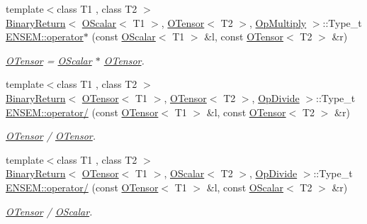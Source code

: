 \begin{DoxyCompactItemize}
{\footnotesize template$<$class T1 , class T2 $>$ }\\\mbox{\hyperlink{structENSEM_1_1BinaryReturn}{Binary\+Return}}$<$ \mbox{\hyperlink{classENSEM_1_1OScalar}{O\+Scalar}}$<$ T1 $>$, \mbox{\hyperlink{classENSEM_1_1OTensor}{O\+Tensor}}$<$ T2 $>$, \mbox{\hyperlink{structENSEM_1_1OpMultiply}{Op\+Multiply}} $>$\+::Type\+\_\+t \mbox{\hyperlink{group__obstensor_gacf15f85a2bbaf20f2ccb489bd28690c6}{E\+N\+S\+E\+M\+::operator$\ast$}} (const \mbox{\hyperlink{classENSEM_1_1OScalar}{O\+Scalar}}$<$ T1 $>$ \&l, const \mbox{\hyperlink{classENSEM_1_1OTensor}{O\+Tensor}}$<$ T2 $>$ \&r)
\begin{DoxyCompactList}\small\item\em \mbox{\hyperlink{classENSEM_1_1OTensor}{O\+Tensor}} = \mbox{\hyperlink{classENSEM_1_1OScalar}{O\+Scalar}} $\ast$ \mbox{\hyperlink{classENSEM_1_1OTensor}{O\+Tensor}}. \end{DoxyCompactList}\item 
{\footnotesize template$<$class T1 , class T2 $>$ }\\\mbox{\hyperlink{structENSEM_1_1BinaryReturn}{Binary\+Return}}$<$ \mbox{\hyperlink{classENSEM_1_1OTensor}{O\+Tensor}}$<$ T1 $>$, \mbox{\hyperlink{classENSEM_1_1OTensor}{O\+Tensor}}$<$ T2 $>$, \mbox{\hyperlink{structENSEM_1_1OpDivide}{Op\+Divide}} $>$\+::Type\+\_\+t \mbox{\hyperlink{group__obstensor_gab78687abe74ea9ae63cc1a98de644b13}{E\+N\+S\+E\+M\+::operator/}} (const \mbox{\hyperlink{classENSEM_1_1OTensor}{O\+Tensor}}$<$ T1 $>$ \&l, const \mbox{\hyperlink{classENSEM_1_1OTensor}{O\+Tensor}}$<$ T2 $>$ \&r)
\begin{DoxyCompactList}\small\item\em \mbox{\hyperlink{classENSEM_1_1OTensor}{O\+Tensor}} / \mbox{\hyperlink{classENSEM_1_1OTensor}{O\+Tensor}}. \end{DoxyCompactList}\item 
{\footnotesize template$<$class T1 , class T2 $>$ }\\\mbox{\hyperlink{structENSEM_1_1BinaryReturn}{Binary\+Return}}$<$ \mbox{\hyperlink{classENSEM_1_1OTensor}{O\+Tensor}}$<$ T1 $>$, \mbox{\hyperlink{classENSEM_1_1OScalar}{O\+Scalar}}$<$ T2 $>$, \mbox{\hyperlink{structENSEM_1_1OpDivide}{Op\+Divide}} $>$\+::Type\+\_\+t \mbox{\hyperlink{group__obstensor_ga5810ade8421abe1d7a6cf07748ac83d3}{E\+N\+S\+E\+M\+::operator/}} (const \mbox{\hyperlink{classENSEM_1_1OTensor}{O\+Tensor}}$<$ T1 $>$ \&l, const \mbox{\hyperlink{classENSEM_1_1OScalar}{O\+Scalar}}$<$ T2 $>$ \&r)
\begin{DoxyCompactList}\small\item\em \mbox{\hyperlink{classENSEM_1_1OTensor}{O\+Tensor}} / \mbox{\hyperlink{classENSEM_1_1OScalar}{O\+Scalar}}. \end{DoxyCompactList}\item 

\end{DoxyCompactItemize}
